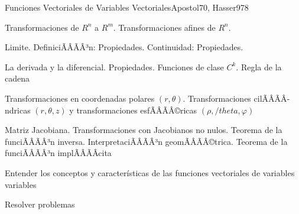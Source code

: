 \begin{sumilla}
\begin{unit}{Funciones Vectoriales de Variables Vectoriales}{Apostol70, Hasser97}{8}
   \begin{topicos}
         \item  Transformaciones de $R^n$ a $R^m$. Transformaciones afines de $R^n$.
	 \item  Limite. DefiniciÃÂÃÂ³n: Propiedades. Continuidad: Propiedades.
         \item  La derivada y la diferencial. Propiedades. Funciones de clase $C^k$. Regla de la cadena
	 \item  Transformaciones en coordenadas polares $(r,\theta)$. Transformaciones cilÃÂÃÂ­ndricas  $(r,\theta,z)$ y transformaciones esfÃÂÃÂ©ricas $(\rho,/theta,\varphi)$
         \item  Matriz Jacobiana. Transformaciones con Jacobianos no nulos. Teorema de la funciÃÂÃÂ³n inversa. InterpretaciÃÂÃÂ³n geomÃÂÃÂ©trica. Teorema de la funciÃÂÃÂ³n implÃÂÃÂ­cita
   \end{topicos}

   \begin{objetivos}
         \item  Entender los conceptos y caracter\'isticas de las funciones vectoriales de variables variables
         \item  Resolver problemas
   \end{objetivos}
\end{unit}


\end{sumilla}
